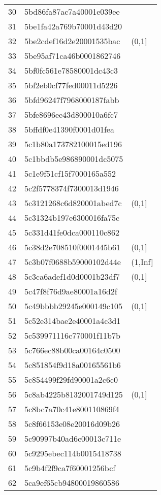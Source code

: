 \begin{table}[ht]
\begin{tabular}{rll}
  30 & 5bd86fa87ac7a40001e039ee &  \\ 
  31 & 5be1fa42a769b70001d43d20 &  \\ 
  32 & 5be2cdef16d2e20001535bac & (0,1] \\ 
  33 & 5be95af71ca46b0001862746 &  \\ 
  34 & 5bf0fc561e78580001dc43c3 &  \\ 
  35 & 5bf2eb0cf77fed00011d5226 &  \\ 
  36 & 5bfd96247f7968000187fabb &  \\ 
  37 & 5bfe8696ee43d800010a6fc7 &  \\ 
  38 & 5bffdf0e41390f0001d01fea &  \\ 
  39 & 5c1b80a173782100015ed196 &  \\ 
  40 & 5c1bbdb5e986890001dc5075 &  \\ 
  41 & 5c1e9f51cf15f7000165a552 &  \\ 
  42 & 5c2f5778374f7300013d1946 &  \\ 
  43 & 5c3121268c6d820001abed7c & (0,1] \\ 
  44 & 5c31324b197e6300016fa75c &  \\ 
  45 & 5c331d41fe0dca000110c862 &  \\ 
  46 & 5c38d2e708510f0001445b61 & (0,1] \\ 
  47 & 5c3b07f0688b59000102d44e & (1,Inf] \\ 
  48 & 5c3ca6adef1d0d0001b23df7 & (0,1] \\ 
  49 & 5c47f8f76d9ae80001a16d2f &  \\ 
  50 & 5c49bbbb29245e000149c105 & (0,1] \\ 
  51 & 5c52e314bae2e40001a4c3d1 &  \\ 
  52 & 5c539971116c770001f11b7b &  \\ 
  53 & 5c766ec88b00ca00164c0500 &  \\ 
  54 & 5c851854f9d18a00165561b6 &  \\ 
  55 & 5c854499f29fd90001a2c6c0 &  \\ 
  56 & 5c8ab4225b8132001749d125 & (0,1] \\ 
  57 & 5c8bc7a70c41e800110869f4 &  \\ 
  58 & 5c8f66153e08e20016d09b26 &  \\ 
  59 & 5c90997b40ad6c00013c711e &  \\ 
  60 & 5c9295ebec114b0015418738 &  \\ 
  61 & 5c9b4f2f9ca7f60001256bcf &  \\ 
  62 & 5ca9ef65cb94800019860586 &  \\ 

\end{tabular}
\end{table}
